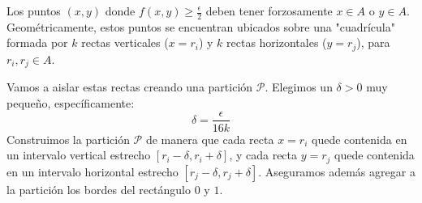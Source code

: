 \documentclass[11pt,letterpaper]{article}
\begin{document}
Los puntos $(x,y)$ donde $f(x,y) \ge \frac{\epsilon}{2}$ deben tener forzosamente $x \in A$ o $y \in A$. Geométricamente, estos puntos se encuentran ubicados sobre una "cuadrícula" formada por $k$ rectas verticales ($x = r_{i}$) y $k$ rectas horizontales ($y = r_{j}$), para $r_{i}, r_{j} \in A$.

Vamos a aislar estas rectas creando una partición $\mathcal{P}$. Elegimos un $\delta > 0$ muy pequeño, específicamente:
\begin{equation*}
\delta = \frac{\epsilon}{16k}
\end{equation*}
Construimos la partición $\mathcal{P}$ de manera que cada recta $x = r_{i}$ quede contenida en un intervalo vertical estrecho $[r_{i}-\delta, r_{i}+\delta]$, y cada recta $y = r_{j}$ quede contenida en un intervalo horizontal estrecho $[r_{j}-\delta, r_{j}+\delta]$. Aseguramos además agregar a la partición los bordes del rectángulo $0$ y $1$. 
\end{document}
